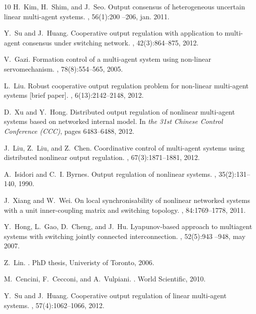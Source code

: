 \documentclass[onecolumn,a4paper,12pt]{article}
\numberwithin{equation}{section}
\begin{document}
\begin{thebibliography}{10}
H.~Kim, H.~Shim, and J.~Seo.
\newblock Output consensus of heterogeneous uncertain linear multi-agent
  systems.
, 56(1):200 --206, jan. 2011.

Y.~Su and J.~Huang.
\newblock Cooperative output regulation with application to multi-agent
  consensus under switching network.
, 42(3):864--875, 2012.

V.~Gazi.
\newblock Formation control of a multi-agent system using non-linear
  servomechanism.
, 78(8):554--565, 2005.

L.~Liu.
\newblock Robust cooperative output regulation problem for non-linear
  multi-agent systems [brief paper].
, 6(13):2142--2148, 2012.

D.~Xu and Y.~Hong.
\newblock Distributed output regulation of nonlinear multi-agent systems based
  on networked internal model.
\newblock In {\em the 31st Chinese Control Conference (CCC)}, pages 6483--6488,
  2012.

J.~Liu, Z.~Liu, and Z.~Chen.
\newblock Coordinative control of multi-agent systems using distributed
  nonlinear output regulation.
, 67(3):1871--1881, 2012.

A.~Isidori and C.~I. Byrnes.
\newblock Output regulation of nonlinear systems.
, 35(2):131--140, 1990.

J.~Xiang and W.~Wei.
\newblock On local synchronisability of nonlinear networked systems with a unit
  inner-coupling matrix and switching topology.
, 84:1769--1778, 2011.

Y.~Hong, L.~Gao, D.~Cheng, and J.~Hu.
\newblock Lyapunov-based approach to multiagent systems with switching jointly
  connected interconnection.
, 52(5):943 --948, may
  2007.

Z.~Lin.
.
\newblock PhD thesis, Univeristy of Toronto, 2006.

M.~Cencini, F.~Cecconi, and A.~Vulpiani.
.
\newblock World Scientific, 2010.

Y.~Su and J.~Huang.
\newblock Cooperative output regulation of linear multi-agent systems.
, 57(4):1062--1066, 2012.

\end{thebibliography}
\end{document}
